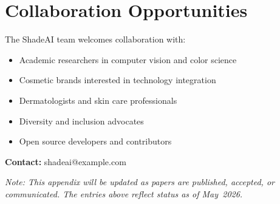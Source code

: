\section{Collaboration Opportunities}

The ShadeAI team welcomes collaboration with:

\begin{itemize}
    \item Academic researchers in computer vision and color science
    \item Cosmetic brands interested in technology integration
    \item Dermatologists and skin care professionals
    \item Diversity and inclusion advocates
    \item Open source developers and contributors
\end{itemize}

\textbf{Contact:} shadeai@example.com

\vspace{1cm}

\textit{Note: This appendix will be updated as papers are published, accepted, or communicated. The entries above reflect status as of May~2026.}
